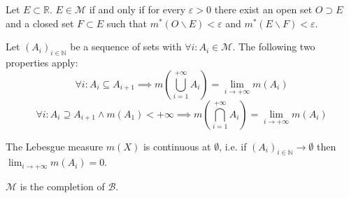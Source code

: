         \begin{theorem}
		Let $E\subset\mathbb{R}$. $E\in\mathcal{M}$ if and only if for every $\varepsilon>0$ there exist an open set $O\supset E$ and a closed set $F\subset E$ such that $m^*(O\backslash E) < \varepsilon$ and $m^*(E\backslash F)<\varepsilon$.
	\end{theorem}
        
        \begin{property}
		Let $(A_i)_{i\in\mathbb{N}}$ be a sequence of sets with $\forall i:A_i\in\mathcal{M}$. The following two properties apply:
        	\begin{equation}
        	    	\forall i: A_i\subseteq A_{i+1} \implies m\left(\bigcup_{i=1}^{+\infty}A_i\right) = \lim_{i\rightarrow+\infty}m(A_i)
		\end{equation}
        	\begin{equation}
        	    	\forall i: A_i\supseteq A_{i+1} \land m(A_1)<+\infty\implies m\left(\bigcap_{i=1}^{+\infty}A_i\right) = \lim_{i\rightarrow+\infty}m(A_i)
		\end{equation}
	\end{property}
        \begin{property}
		The Lebesgue measure $m(X)$ is continuous at $\emptyset$, i.e. if $(A_i)_{i\in\mathbb{N}}\rightarrow\emptyset$ then $\displaystyle\lim_{i\rightarrow+\infty}m(A_i) = 0$.
	\end{property}
        
        \begin{theorem}
		$\mathcal{M}$ is the completion of $\mathcal{B}$.
	\end{theorem}
        
        
